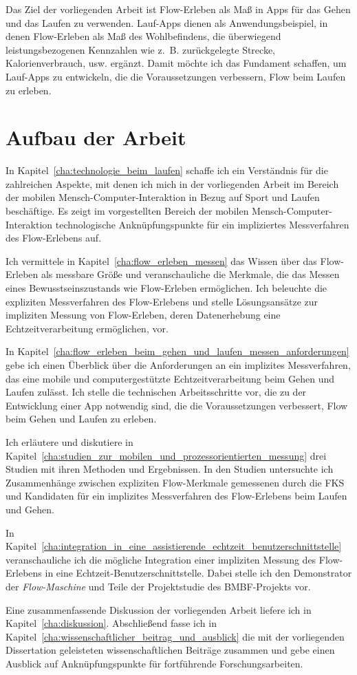 Das Ziel der vorliegenden Arbeit ist Flow-Erleben als Maß in Apps für das Gehen und das Laufen zu verwenden. Lauf-Apps dienen als Anwendungsbeispiel, in denen Flow-Erleben als Maß des Wohlbefindens, die überwiegend leistungsbezogenen Kennzahlen wie z.~B. zurückgelegte Strecke, Kalorienverbrauch, usw. ergänzt. Damit möchte ich das Fundament schaffen, um Lauf-Apps zu entwickeln, die die Voraussetzungen verbessern, Flow beim Laufen zu erleben.

\section{Aufbau der Arbeit}

In Kapitel~\ref{cha:technologie_beim_laufen} schaffe ich ein Verständnis für die zahlreichen Aspekte, mit denen ich mich in der vorliegenden Arbeit im Bereich der mobilen Mensch-Computer-Interaktion in Bezug auf Sport und Laufen beschäftige. Es zeigt im vorgestellten Bereich der mobilen Mensch-Computer-Interaktion technologische Anknüpfungspunkte für ein impliziertes Messverfahren des Flow-Erlebens auf.

Ich vermittele in Kapitel~\ref{cha:flow_erleben_messen} das Wissen über das Flow-Erleben als messbare Größe und veranschauliche die Merkmale, die das Messen eines Bewusstseinszustands wie Flow-Erleben ermöglichen. Ich beleuchte die expliziten Messverfahren des Flow-Erlebens und stelle Lösungsansätze zur impliziten Messung von Flow-Erleben, deren Datenerhebung eine Echtzeitverarbeitung ermöglichen, vor.

In Kapitel~\ref{cha:flow_erleben_beim_gehen_und_laufen_messen_anforderungen} gebe ich einen Überblick über die Anforderungen an ein implizites Messverfahren, das eine mobile und computergestützte Echtzeitverarbeitung beim Gehen und Laufen zulässt. Ich stelle die technischen Arbeitsschritte vor, die zu der Entwicklung einer App notwendig sind, die die Voraussetzungen verbessert, Flow beim Gehen und Laufen zu erleben.

Ich erläutere und diskutiere in Kapitel~\ref{cha:studien_zur_mobilen_und_prozessorientierten_messung} drei Studien mit ihren Methoden und Ergebnissen. In den Studien untersuchte ich Zusammenhänge zwischen expliziten Flow-Merkmale gemessenen durch die \ac{FKS} und Kandidaten für ein implizites Messverfahren des Flow-Erlebens beim Laufen und Gehen.

In Kapitel~\ref{cha:integration_in_eine_assistierende_echtzeit_benutzerschnittstelle} veranschauliche ich die mögliche Integration einer impliziten Messung des Flow-Erlebens in eine Echtzeit-Benutzerschnittstelle. Dabei stelle ich den Demonstrator der \emph{Flow-Maschine} und Teile der Projektstudie des \acs{BMBF}-Projekts vor.

Eine zusammenfassende Diskussion der vorliegenden Arbeit liefere ich in Kapitel~\ref{cha:diskussion}. Abschließend fasse ich in Kapitel~\ref{cha:wissenschaftlicher_beitrag_und_ausblick} die mit der vorliegenden Dissertation geleisteten wissenschaftlichen Beiträge zusammen und gebe einen Ausblick auf Anknüpfungspunkte für fortführende Forschungsarbeiten.
